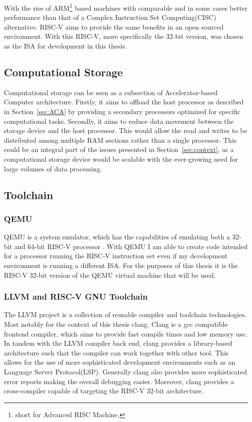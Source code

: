 With the rise of ARM\footnote{short for Advanced RISC Machine.} based machines
with comparable and in some cases better performance than that of a Complex
Instruction Set Computing(CISC) alternative.\cite{Power_Struggle} RISC-V aims to
provide the same benefits in an open sourced environment. With this RISC-V, more
specifically the 32-bit version, was chosen as the ISA for development in this
thesis.

\subsection{Computational Storage}
Computational storage can be seen as a subsection of Accelerator-based Computer
architecture. Firstly, it aims to offload the host processor as described in
Section~\ref{sec:ACA} by providing a secondary processors optimized for specific
computational tasks. Secondly, it aims to reduce data movement between the
storage device and the host processor. This would allow the read and writes to
be distributed among multiple RAM sections rather than a single processor. This
could be an integral part of the issues presented in Section~\ref{sec:context},
as a computational storage device would be scalable with the ever-growing need
for large volumes of data processing.


\subsection{Toolchain}
\subsubsection*{QEMU}
QEMU is a system emulator, which has the capabilities of emulating both a 32-bit
and 64-bit RISC-V processor \cite{QEMU}. With QEMU I am able to create code
intended
for a processor running the RISC-V instruction set even if my development
environment is running a different ISA. For the purposes of this thesis it is the
RISC-V 32-bit version of the QEMU virtual machine that will be used.

\subsubsection*{LLVM and RISC-V GNU Toolchain}
The LLVM project is a collection of reusable compiler and toolchain
technologies. Most notably for the context of this thesis clang. Clang is a gcc
compatible frontend compiler, which aims to provide fast compile times and low
memory use. In tandem with the LLVM compiler back end, clang provides a
library-based architecture such that the compiler can work together with other
tool. This allows for the use of more sophisticated development environments
such as an Language Server Protocol(LSP). Generally clang also provides more
sophisticated error reports making the overall debugging easier. Moreover, clang
provides a cross-compiler capable of targeting the RISC-V 32-bit architecture.

